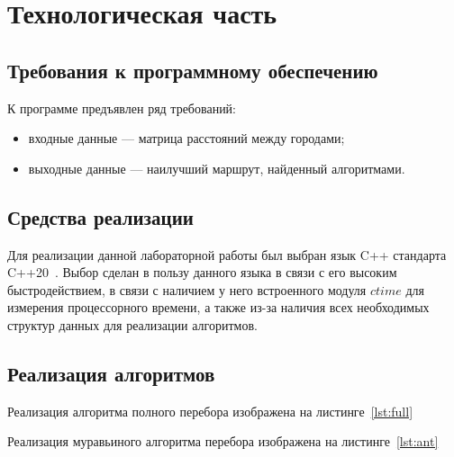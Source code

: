 \section{Технологическая часть}

\subsection{Требования к программному обеспечению}\label{section:requirements}
К программе предъявлен ряд требований: 
\begin{itemize}
    \item входные данные --- матрица расстояний между городами;
    \item выходные данные --- наилучший маршрут, найденный алгоритмами.
\end{itemize}

\subsection{Средства реализации}

Для реализации данной лабораторной работы был выбран язык C++ стандарта C++20~\cite{cpp}. Выбор сделан в пользу данного языка в связи с его высоким быстродействием, в связи с наличием у него встроенного модуля $ctime$ для измерения процессорного времени, а также из-за наличия всех необходимых структур данных для реализации алгоритмов.
 
\clearpage
\subsection{Реализация алгоритмов}

Реализация алгоритма полного перебора изображена на листинге~\ref{lst:full}

Реализация муравьиного алгоритма перебора изображена на листинге~\ref{lst:ant}

